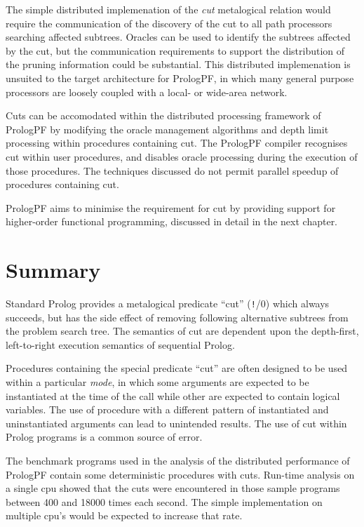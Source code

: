 The simple distributed implemenation of the \textit{cut} metalogical relation would require
the communication of the discovery of the cut to all path processors searching affected
subtrees.  Oracles can be used to identify the subtrees affected by the cut, but the
communication requirements to support the distribution of the pruning information could
be substantial.  This distributed implemenation is unsuited to the target architecture for
PrologPF, in which many general purpose processors are loosely coupled with a local- or
wide-area network.

Cuts can be accomodated within the distributed processing framework of PrologPF by modifying
the oracle management algorithms and depth limit processing within procedures containing
cut.  The PrologPF compiler recognises cut within user procedures, and disables oracle
processing during the execution of those procedures.  The techniques discussed do not permit
parallel speedup of procedures containing cut.

PrologPF aims to minimise the requirement for cut by providing support for higher-order
functional programming, discussed in detail in the next chapter.

\section{Summary} %

Standard Prolog \cite{DEDC96} provides a metalogical predicate ``cut''
(\texttt{!}/0) which always succeeds, but has the side effect of
removing following alternative subtrees from the problem search tree.
The semantics of cut are dependent upon the depth-first, left-to-right
execution semantics of sequential Prolog.

Procedures containing the special predicate ``cut'' are often designed to be used within
a particular \textit{mode}, in which some arguments are expected to be instantiated at
the time of the call while other are expected to contain logical variables.  The use
of procedure with a different pattern of instantiated and uninstantiated arguments can
lead to unintended results.  The use of cut within Prolog programs is a common
source of error.

The benchmark programs used in the analysis of the distributed performance of PrologPF
contain some deterministic procedures with cuts.  Run-time analysis on a single cpu
showed that the cuts were encountered in those sample programs between 400 and 18000 times
each second.  The simple implementation on multiple cpu's would be expected to increase
that rate.

